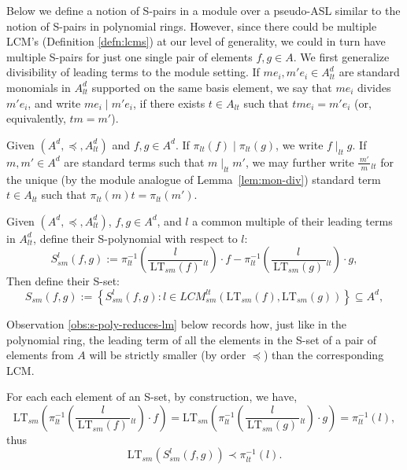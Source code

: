 \documentclass[11pt,reqno]{amsart}
\newcommand{\suchthat}{:}
\newcommand{\ltfrac}[2]{\frac{\,#1\,}{\,#2\,}{}_{{\scriptscriptstyle lt}}}
\newcommand{\divides}{\mid}
\newcommand{\ltdivides}{\mid_{lt}}
\newcommand{\ltsm}{\text{LT}_{sm}}
\newcommand{\lcmlt}{LCM_{sm}^{lt}}
\newcommand{\Ssm}{S_{sm}}
\newcommand{\piltd}{\pi_{lt}}
\theoremstyle{definition}
\numberwithin{equation}{section}
\begin{document}
Below we define a notion of S-pairs in a module over a pseudo-ASL similar to the notion of S-pairs in polynomial rings. However, since there could be multiple LCM's (Definition \ref{defn:lcms}) at our level of generality, we could in turn have multiple S-pairs for just one single pair of elements $f, g \in A$. We first generalize divisibility of leading terms to the module setting. If $m e_i ,m' e_i \in A_{lt}^d$ are standard monomials in $A_{lt}^d$ supported on the same basis element, we say that $me_i$ divides $m' e_i$, and write $me_i \divides m' e_i$, if there exists $t \in A_{lt}$ such that $tme_i = m' e_i$ (or, equivalently, $tm = m'$). 

\begin{definition} \label{def:ltdivides-modules}
Given $(A^d, \preceq, A_{lt}^d)$ and $f,g \in A^d$. If $\piltd(f) \divides \piltd(g)$, we write $f \ltdivides g$. If $m,m' \in A^d$ are standard terms such that $m \ltdivides m'$, we may further write $\ltfrac{m'}{m}$ for the unique (by the module analogue of Lemma~\ref{lem:mon-div}) standard term $t \in A_{lt}$ such that $\piltd(m)t = \piltd(m')$. 
\end{definition}

\begin{definition}
\label{defn:sset}
Given $(A^d, \preceq, A_{lt}^d)$, $f, g \in A^d$, and $l$ a common multiple of their leading terms in $A_{lt}^d$, define their S-polynomial with respect to $l$:
\[
\Ssm^l(f,g) := \pi_{lt}^{-1}\left(\ltfrac{l}{\ltsm(f)}\right)\cdot f - \pi_{lt}^{-1}\left(\ltfrac{l}{\ltsm(g)}\right)\cdot g,
\]
Then define their S-set:
\[
\Ssm(f,g) := \left\{ \Ssm^l(f,g) \suchthat l \in \lcmlt(\ltsm(f), \ltsm(g))\right\} \subseteq A^d,
\]
\end{definition}

Observation \ref{obs:s-poly-reduces-lm} below records how, just like in the polynomial ring, the leading term of all the elements in the S-set of a pair of elements from $A$ will be strictly smaller (by order $\preceq$) than the corresponding LCM.

\begin{observation}
\label{obs:s-poly-reduces-lm}
For each each element of an S-set, by construction, we have, \[\ltsm\left(\pi_{lt}^{-1}\left(\ltfrac{l}{\ltsm(f)}\right)\cdot f \right) = \ltsm \left(\pi_{lt}^{-1}\left(\ltfrac{l}{\ltsm(g)}\right)\cdot g \right) = \pi_{lt}^{-1}(l),\]
thus 
\[
\ltsm\left(\Ssm^l(f,g)\right) \prec \pi_{lt}^{-1}(l).
\]
\end{observation}
\end{document}
